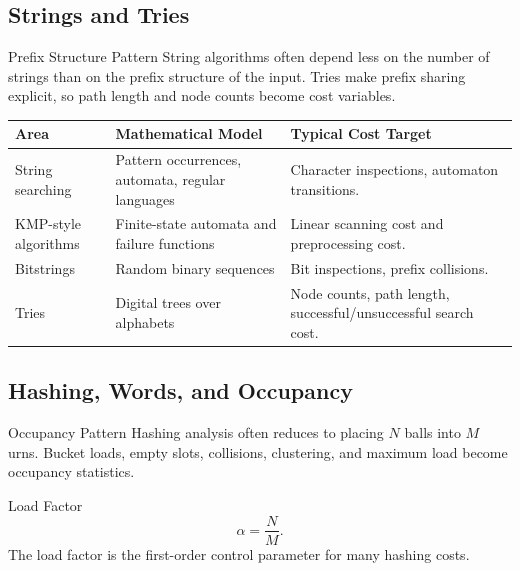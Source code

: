 \documentclass[11pt]{article}
\begin{document}
\subsection{Strings and Tries}

\begin{patternbox}{Prefix Structure Pattern}
String algorithms often depend less on the number of strings than on the prefix structure of the input. Tries make prefix sharing explicit, so path length and node counts become cost variables.
\end{patternbox}

\begin{center}
\begin{tabularx}{\textwidth}{L{0.25\textwidth} L{0.31\textwidth} Y}
\toprule
\textbf{Area} & \textbf{Mathematical Model} & \textbf{Typical Cost Target} \\
\midrule
String searching & Pattern occurrences, automata, regular languages & Character inspections, automaton transitions. \\
KMP-style algorithms & Finite-state automata and failure functions & Linear scanning cost and preprocessing cost. \\
Bitstrings & Random binary sequences & Bit inspections, prefix collisions. \\
Tries & Digital trees over alphabets & Node counts, path length, successful/unsuccessful search cost. \\
\bottomrule
\end{tabularx}
\end{center}

\subsection{Hashing, Words, and Occupancy}

\begin{patternbox}{Occupancy Pattern}
Hashing analysis often reduces to placing \(N\) balls into \(M\) urns. Bucket loads, empty slots, collisions, clustering, and maximum load become occupancy statistics.
\end{patternbox}

\begin{mathbox}{Load Factor}
\[
\alpha=\frac{N}{M}.
\]
The load factor is the first-order control parameter for many hashing costs.
\end{mathbox}
\end{document}
